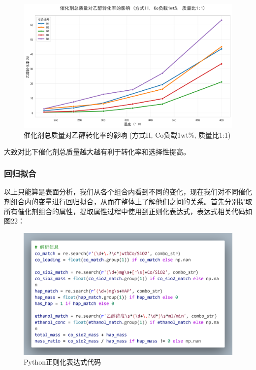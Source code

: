 \begin{figure}[h]%
	\centering%
	\includegraphics [scale=0.6]{图/2-6-1-2.png}
	\caption{催化剂总质量对乙醇转化率的影响 (方式II, Co负载1wt\%, 质量比1:1)} 
	\label{fig:1}
\end{figure}

大致对比下催化剂总质量越大越有利于转化率和选择性提高。


\subsubsection{回归拟合}	
以上只能算是表面分析，我们从各个组合内看到不同的变化，现在我们对不同催化剂组合内的变量进行回归拟合，从而在整体上了解他们之间的关系。首先分别提取所有催化剂组合的属性，提取属性过程中使用到正则化表达式，表达式相关代码如图22：

\begin{figure}[h]%
	\centering%
	\includegraphics [scale=0.2]{图/code_1.png}
	\caption{Python正则化表达式代码} 
	\label{fig:1}
\end{figure}

